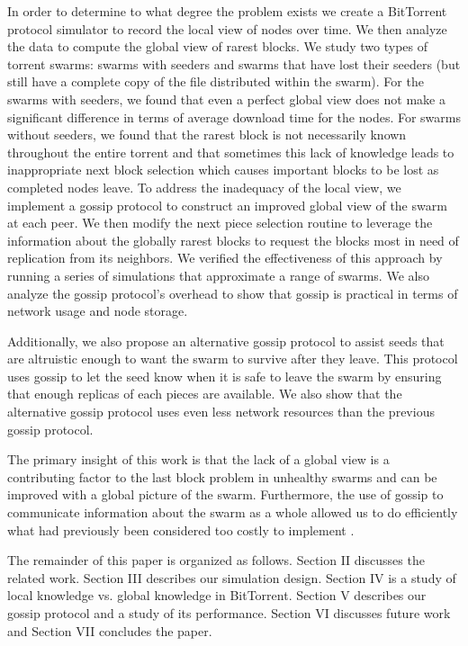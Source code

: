 In order to determine to what degree the problem exists we create a
BitTorrent protocol simulator to record the local view of nodes over
time. We then analyze the data to compute the global view of rarest
blocks. We study two types of torrent swarms: swarms with seeders and
swarms that have lost their seeders (but still have a complete copy of
the file distributed within the swarm). For the swarms with seeders,
we found that even a perfect global view does not make a significant
difference in terms of average download time for the nodes. For swarms
without seeders, we found that the rarest block is not necessarily
known throughout the entire torrent and that sometimes this lack of
knowledge leads to inappropriate next block selection which causes
important blocks to be lost as completed nodes leave. To address
the inadequacy of the local view, we implement a gossip protocol to
construct an improved global view of the swarm at each peer.  We then
modify the next piece selection routine to leverage the information
about the globally rarest blocks to request the blocks most in need of
replication from its neighbors. We verified the effectiveness of this approach 
by running a series of simulations that approximate a
range of swarms. We also analyze the gossip protocol's overhead to show
that gossip is practical in terms of network usage and node storage.

Additionally, we also propose an alternative gossip protocol to assist
seeds that are altruistic enough to want the swarm to survive after they
leave. This protocol uses gossip to let the seed know when it is safe
to leave the swarm by ensuring that enough replicas of each pieces are
available. We also show that the alternative gossip protocol uses even
less network resources than the previous gossip protocol.


The primary insight of this work is that the lack of a global view is
a contributing factor to the last block problem in unhealthy swarms
and can be improved with a global picture of the swarm.  Furthermore,
the use of gossip to communicate information about the swarm as a whole
allowed us to do efficiently what had previously been considered too
costly to implement \cite{cohen:1}.


The remainder of this paper is organized as follows. Section II discusses
the related work. Section III describes our simulation design.  Section IV
is a study of local knowledge vs. global knowledge in BitTorrent.  Section
V describes our gossip protocol and a study of its performance. Section
VI discusses future work and Section VII concludes the paper.
